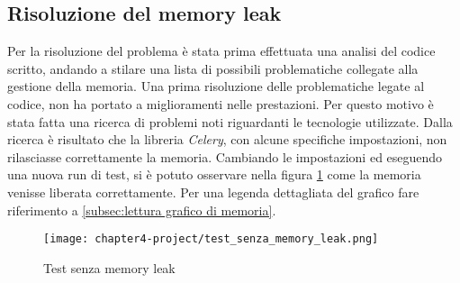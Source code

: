 \subsection{Risoluzione del memory leak}
Per la risoluzione del problema è stata prima effettuata una analisi del codice scritto, andando a stilare una lista di possibili problematiche collegate alla gestione della memoria. Una prima risoluzione delle problematiche legate al codice, non ha portato a miglioramenti nelle prestazioni. Per questo motivo è stata fatta una ricerca di problemi noti riguardanti le tecnologie utilizzate. Dalla ricerca è risultato che la libreria \emph{Celery}, con alcune specifiche impostazioni, non rilasciasse correttamente la memoria. Cambiando le impostazioni ed eseguendo una nuova run di test, si è potuto osservare nella figura \ref{fig:test senza memory leak} come la memoria venisse liberata correttamente. Per una legenda dettagliata del grafico fare riferimento a \ref{subsec:lettura grafico di memoria}.

\begin{figure}[!h] 
    \centering 
    \texttt{[image: chapter4-project/test\_senza\_memory\_leak.png]} 
    \caption{Test senza memory leak}
    \label{fig:test senza memory leak}
\end{figure}